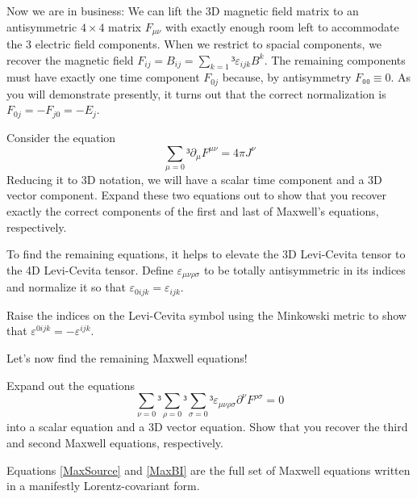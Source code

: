 Now we are in business: We can lift the 3D magnetic field matrix to an antisymmetric $4×4$ matrix $F_{μν}$ with exactly enough room left to accommodate the 3 electric field components. When we restrict to spacial components, we recover the magnetic field  $F_{ij}=B_{ij}= ∑_{k=1}³ 𝜀_{ijk} B^k$. The remaining components must have exactly one time component $F_{0j}$ because, by antisymmetry $F₀₀ ≡ 0$. As you will demonstrate presently, it turns out that the correct normalization is $F_{0j} = - F_{j0}= - E_j$.
\begin{exercise}
Consider the equation 
\begin{equation}\label{MaxSource}
∑_{μ =0}³ ∂_μ F^{μν}=4π J^ν
\end{equation}
Reducing it to 3D notation, we will have a scalar time component and a 3D vector component. Expand these two equations out to show that you recover exactly the correct components of the first and last of Maxwell's equations, respectively.
\end{exercise}

To find the remaining equations, it helps to elevate the 3D Levi-Cevita tensor to the 4D Levi-Cevita tensor. Define $𝜀_{μνρσ}$ to be totally antisymmetric in its indices and normalize it so that $𝜀_{0ijk} = 𝜀_{ijk}$. 
\begin{exercise}
Raise the indices on the Levi-Cevita symbol using the Minkowski metric to show that $𝜀^{0ijk} = - 𝜀^{ijk}$. 
\end{exercise}
Let's now find the remaining Maxwell equations!
\begin{exercise}
Expand out the equations 
\begin{equation}\label{MaxBI}
∑_{ν =0}³ ∑_{ρ =0}³ ∑_{σ =0}³ 𝜀_{μ ν ρ σ} ∂^ν  F^{ρσ} = 0
\end{equation}
into a scalar equation and a 3D vector equation. Show that you recover the third and second Maxwell equations, respectively. 
\end{exercise}
Equations \eqref{MaxSource} and \eqref{MaxBI} are the full set of Maxwell equations written in a manifestly Lorentz-covariant form. 

